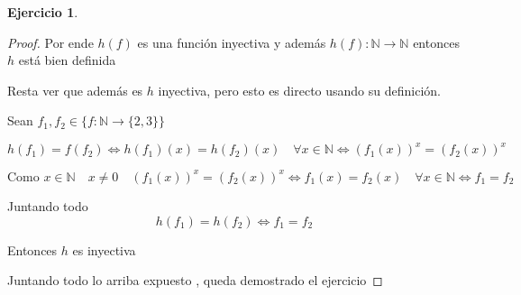 \documentclass[12pt]{article}
\newcommand{\N}{\mathbb{N}}
\newcommand{\ra}{\rightarrow}
\theoremstyle{definition}
\newtheorem{ej}{Ejercicio}
\begin{document}
\begin{ej}
\begin{proof}
    Por ende $h(f)$ es una función inyectiva y además $h(f):\N \ra \N$ entonces $h$ está bien definida

    Resta ver que además es $h$ inyectiva, pero esto es directo usando su definición. 

    Sean $f_{1},f_{2} \in \{f: \N \ra \{2,3\}\}$

    $$ h(f_{1}) = f(f_{2}) \iff h(f_{1})(x) = h(f_{2})(x) \quad \forall x \in \N \iff (f_{1}(x))^x = (f_{2}(x))^x$$

    $$\text{Como } x \in \N \quad x \neq 0 \quad  (f_{1}(x))^x = (f_{2}(x))^x \iff f_{1}(x) = f_{2}(x) \quad \forall x \in \N \iff f_{1} = f_{2}$$

    Juntando todo 
    $$ h(f_{1}) = h(f_{2}) \iff f_{1} = f_{2}$$

    Entonces $h$ es inyectiva

    Juntando todo lo arriba expuesto , queda demostrado el ejercicio

  \end{proof}

\end{ej}
\end{document}
